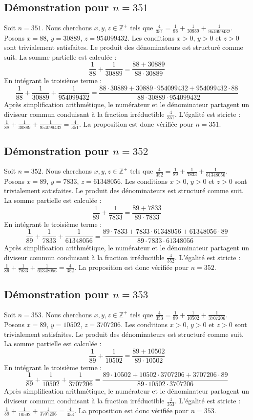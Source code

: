 \documentclass[11pt,a4paper]{article}
\begin{document}
\subsection{Démonstration pour $n = 351$}
Soit $n = 351$. Nous cherchons $x, y, z \in \mathbb{Z}^{+}$ tels que $\frac{4}{351} = \frac{1}{88} + \frac{1}{30889} + \frac{1}{954099432}$.
Posons $x = 88$, $y = 30889$, $z = 954099432$.
Les conditions $x > 0$, $y > 0$ et $z > 0$ sont trivialement satisfaites.
Le produit des dénominateurs est structuré comme suit. La somme partielle est calculée :
$$ \frac{1}{88} + \frac{1}{30889} = \frac{88+30889}{88 \cdot 30889} $$
En intégrant le troisième terme :
$$ \frac{1}{88} + \frac{1}{30889} + \frac{1}{954099432} = \frac{88 \cdot 30889 + 30889 \cdot 954099432 + 954099432 \cdot 88}{88 \cdot 30889 \cdot 954099432} $$
Après simplification arithmétique, le numérateur et le dénominateur partagent un diviseur commun conduisant à la fraction irréductible $\frac{4}{351}$.
L'égalité est stricte : $\frac{1}{88} + \frac{1}{30889} + \frac{1}{954099432} = \frac{4}{351}$.
La proposition est donc vérifiée pour $n = 351$.
\subsection{Démonstration pour $n = 352$}
Soit $n = 352$. Nous cherchons $x, y, z \in \mathbb{Z}^{+}$ tels que $\frac{4}{352} = \frac{1}{89} + \frac{1}{7833} + \frac{1}{61348056}$.
Posons $x = 89$, $y = 7833$, $z = 61348056$.
Les conditions $x > 0$, $y > 0$ et $z > 0$ sont trivialement satisfaites.
Le produit des dénominateurs est structuré comme suit. La somme partielle est calculée :
$$ \frac{1}{89} + \frac{1}{7833} = \frac{89+7833}{89 \cdot 7833} $$
En intégrant le troisième terme :
$$ \frac{1}{89} + \frac{1}{7833} + \frac{1}{61348056} = \frac{89 \cdot 7833 + 7833 \cdot 61348056 + 61348056 \cdot 89}{89 \cdot 7833 \cdot 61348056} $$
Après simplification arithmétique, le numérateur et le dénominateur partagent un diviseur commun conduisant à la fraction irréductible $\frac{4}{352}$.
L'égalité est stricte : $\frac{1}{89} + \frac{1}{7833} + \frac{1}{61348056} = \frac{4}{352}$.
La proposition est donc vérifiée pour $n = 352$.
\subsection{Démonstration pour $n = 353$}
Soit $n = 353$. Nous cherchons $x, y, z \in \mathbb{Z}^{+}$ tels que $\frac{4}{353} = \frac{1}{89} + \frac{1}{10502} + \frac{1}{3707206}$.
Posons $x = 89$, $y = 10502$, $z = 3707206$.
Les conditions $x > 0$, $y > 0$ et $z > 0$ sont trivialement satisfaites.
Le produit des dénominateurs est structuré comme suit. La somme partielle est calculée :
$$ \frac{1}{89} + \frac{1}{10502} = \frac{89+10502}{89 \cdot 10502} $$
En intégrant le troisième terme :
$$ \frac{1}{89} + \frac{1}{10502} + \frac{1}{3707206} = \frac{89 \cdot 10502 + 10502 \cdot 3707206 + 3707206 \cdot 89}{89 \cdot 10502 \cdot 3707206} $$
Après simplification arithmétique, le numérateur et le dénominateur partagent un diviseur commun conduisant à la fraction irréductible $\frac{4}{353}$.
L'égalité est stricte : $\frac{1}{89} + \frac{1}{10502} + \frac{1}{3707206} = \frac{4}{353}$.
La proposition est donc vérifiée pour $n = 353$.
\end{document}
